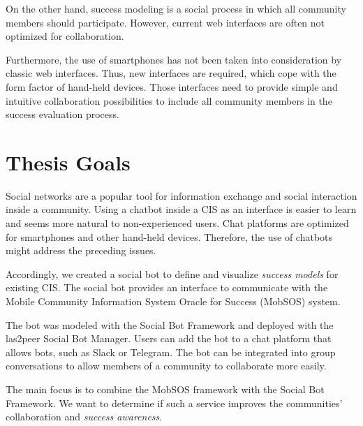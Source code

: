 On the other hand, success modeling is a social process in which all community members should participate. However, current web interfaces are often not optimized for collaboration.

Furthermore, the use of smartphones has not been taken into consideration by classic web interfaces.
Thus, new interfaces are required, which cope with the form factor of hand-held devices. Those interfaces need to provide simple and intuitive collaboration possibilities to include all community members in the success evaluation process. 

\section{Thesis Goals}

Social networks are a popular tool for information exchange and social interaction inside a community.
Using a chatbot inside a CIS as an interface is easier to learn and seems more natural to non-experienced users.
Chat platforms are optimized for smartphones and other hand-held devices. Therefore, the use of chatbots might address the preceding issues.

Accordingly, we created a social bot to define and visualize \emph{success models} for existing CIS. The social bot provides an interface to communicate with the Mobile Community Information System Oracle for Success (MobSOS) system.

The bot was modeled with the Social Bot Framework and deployed with the las2peer Social Bot Manager. Users can add the bot to a chat platform that allows bots, such as Slack or Telegram.
The bot can be integrated into group conversations to allow members of a community to collaborate more easily.

The main focus is to combine the MobSOS framework with the Social Bot Framework. We want to determine if such a service improves the communities' collaboration and \emph{success awareness}.